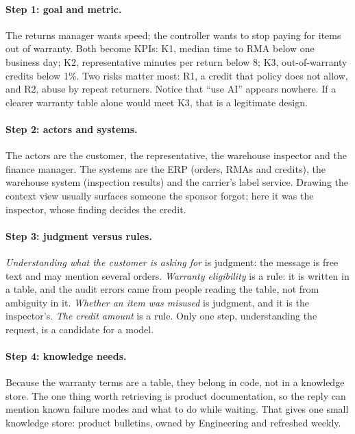 \paragraph{Step 1: goal and metric.} The returns manager wants speed; the controller wants to stop paying for items out of warranty. Both become KPIs: \textsf{K1}, median time to RMA below one business day; \textsf{K2}, representative minutes per return below 8; \textsf{K3}, out-of-warranty credits below 1\%. Two risks matter most: \textsf{R1}, a credit that policy does not allow, and \textsf{R2}, abuse by repeat returners. Notice that ``use AI'' appears nowhere. If a clearer warranty table alone would meet \textsf{K3}, that is a legitimate design.

\paragraph{Step 2: actors and systems.} The actors are the customer, the representative, the warehouse inspector and the finance manager. The systems are the ERP (orders, RMAs and credits), the warehouse system (inspection results) and the carrier's label service. Drawing the context view usually surfaces someone the sponsor forgot; here it was the inspector, whose finding decides the credit.

\paragraph{Step 3: judgment versus rules.} \emph{Understanding what the customer is asking for} is judgment: the message is free text and may mention several orders. \emph{Warranty eligibility} is a rule: it is written in a table, and the audit errors came from people reading the table, not from ambiguity in it. \emph{Whether an item was misused} is judgment, and it is the inspector's. \emph{The credit amount} is a rule. Only one step, understanding the request, is a candidate for a model.

\paragraph{Step 4: knowledge needs.} Because the warranty terms are a table, they belong in code, not in a knowledge store. The one thing worth retrieving is product documentation, so the reply can mention known failure modes and what to do while waiting. That gives one small knowledge store: product bulletins, owned by Engineering and refreshed weekly.

